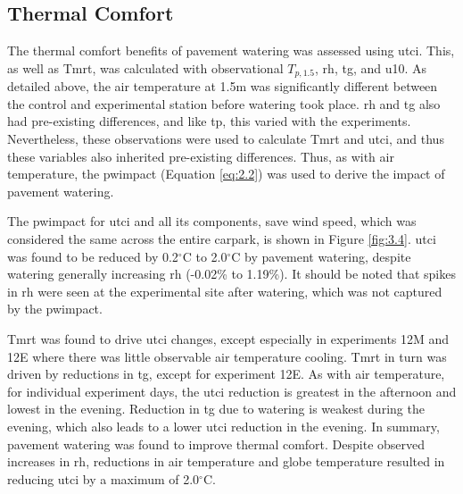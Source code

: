 \documentclass[final,3p,times,authoryear]{elsarticle}
\begin{document}
\subsection{Thermal Comfort}\label{sec:discussion3.2}

The thermal comfort benefits of pavement watering was assessed using \gls{utci}. This, as well as \gls{Tmrt}, was calculated with observational $T_{p,1.5}$, \gls{rh}, \gls{tg}, and \gls{u10}. As detailed above, the air temperature at 1.5m was significantly different between the control and experimental station before watering took place. \gls{rh} and \gls{tg} also had pre-existing differences, and like \gls{tp}, this varied with the experiments. Nevertheless, these observations were used to calculate \gls{Tmrt} and \gls{utci}, and thus these variables also inherited pre-existing differences. Thus, as with air temperature, the \gls{pwimpact} (Equation \ref{eq:2.2}) was used to derive the impact of pavement watering.

The \gls{pwimpact} for \gls{utci} and all its components, save wind speed, which was considered the same across the entire carpark, is shown in Figure \ref{fig:3.4}. \gls{utci} was found to be reduced by 0.2$^{\circ}$C to 2.0$^{\circ}$C by pavement watering, despite watering generally increasing \gls{rh} (-0.02\% to 1.19\%). It should be noted that spikes in \gls{rh} were seen at the experimental site after watering, which was not captured by the \gls{pwimpact}. 

\gls{Tmrt} was found to drive \gls{utci} changes, except especially in experiments 12M and 12E where there was little observable air temperature cooling. \gls{Tmrt} in turn was driven by reductions in \gls{tg}, except for experiment 12E. As with air temperature, for individual experiment days, the \gls{utci} reduction is greatest in the afternoon and lowest in the evening. Reduction in \gls{tg} due to watering is weakest during the evening, which also leads to a lower \gls{utci} reduction in the evening. In summary, pavement watering was found to improve thermal comfort. Despite observed increases in \gls{rh}, reductions in air temperature and globe temperature resulted in reducing \gls{utci} by a maximum of 2.0$^{\circ}$C.
\end{document}
